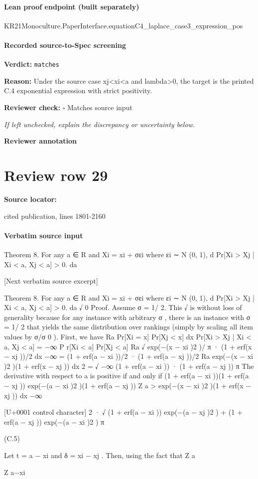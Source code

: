 \documentclass[10pt]{article}
\newcommand{\reviewerbox}{%
  \par\noindent\fbox{\parbox{0.96\linewidth}{\rule{0pt}{0.38in}}}\par
}
\newcommand{\reviewmatch}[1]{%
  \par\noindent\textbf{Reviewer check:} $\square$\; #1\par
  \noindent\emph{If left unchecked, explain the discrepancy or uncertainty below.}\par
}
\begin{document}
\paragraph{Lean proof endpoint (built separately)}\begin{ReviewVerbatim}
KR21Monoculture.PaperInterface.equationC4_laplace_case3_expression_pos
\end{ReviewVerbatim}

\paragraph{Recorded source-to-Spec screening}
\textbf{Verdict:} \texttt{matches}
\\
{\raggedright
\textbf{Reason:} Under the source case xj<xi<a and lambda>0, the target is the printed C.\allowbreak{}4 exponential expression with strict positivity.\allowbreak{}
\par}
\reviewmatch{Matches source input}
\noindent\textbf{Reviewer annotation}\par
\reviewerbox
\clearpage
\hypertarget{source-claim-33bdbb546218e99a}{}
\section*{Review row 29}
\textbf{Source locator:} {\footnotesize\raggedright cited publication, lines 1801-\allowbreak{}2160\par}
\paragraph{Verbatim source input}
\begin{ReviewVerbatim}
Theorem 8. For any a ∈ R and Xi = xi + σεi where εi ∼ N (0, 1),
d
Pr[Xi > Xj | Xi < a, Xj < a] > 0.
da

[Next verbatim source excerpt]

Theorem 8. For any a ∈ R and Xi = xi + σεi where εi ∼ N (0, 1),
d
Pr[Xi > Xj | Xi < a, Xj < a] > 0.
da
√
0
Proof. Assume σ = 1/ 2. This
√ is without loss of generality because for any instance with arbitrary σ , there
is an instance with σ = 1/ 2 that yields the same distribution over rankings (simply by scaling all item
values by σ/σ 0 ). First, we have
Ra
Pr[Xi = x] Pr[Xj < x] dx
Pr[Xi > Xj | Xi < a, Xj < a] = −∞
P r[Xi < a] Pr[Xj < a]
Ra
√
exp(−(x − xi )2 )/ π · (1 + erf(x − xj ))/2 dx
−∞
=
(1 + erf(a − xi ))/2 · (1 + erf(a − xj ))/2
Ra
exp(−(x − xi )2 )(1 + erf(x − xj )) dx
2
= √ −∞
(1 + erf(a − xi )) · (1 + erf(a − xj ))
π
The derivative with respect to a is positive if and only if
(1 + erf(a − xi ))(1 + erf(a − xj )) exp(−(a − xi )2 )(1 + erf(a − xj ))
Z a
>
exp(−(x − xi )2 )(1 + erf(x − xj )) dx
−∞

[U+0001 control character]
2
· √ (1 + erf(a − xi )) exp(−(a − xj )2 ) + (1 + erf(a − xj )) exp(−(a − xi )2 )
π

(C.5)

Let t = a − xi and δ = xi − xj . Then, using the fact that
Z a

Z a−xi
\end{ReviewVerbatim}
\end{document}

